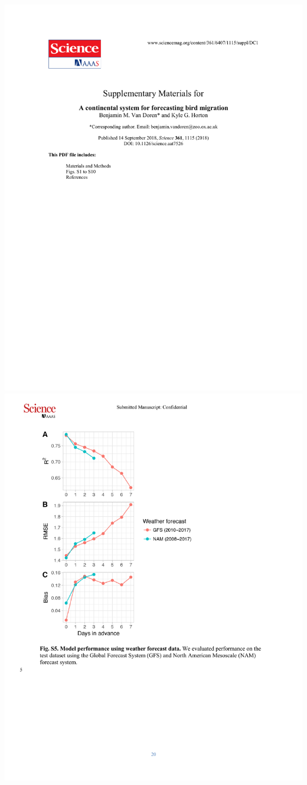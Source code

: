 \documentclass[a4paper, twoside]{templates/ociamthesis}
\begin{document}
\includegraphics[width=1\linewidth]{pdf_chapters/forecast/forecast_supp_crop_Part1}
\includegraphics[width=1\linewidth]{pdf_chapters/forecast/forecast_supp_crop_Part10}
\end{document}
